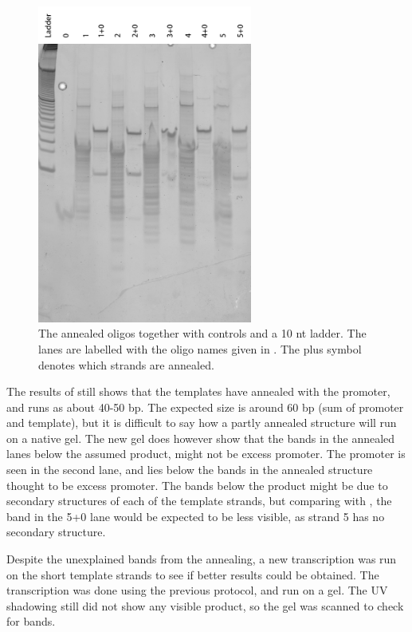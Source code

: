 \begin{figure}[H]
\centering
\includegraphics[width=200pt]{images/translator_annealing_2.png}
\caption{The annealed oligos together with controls and a 10 nt ladder. The lanes are labelled with the oligo names given in . The plus symbol denotes which strands are annealed.}
\label{translator_annealing_2}
\end{figure}

The results of  still shows that the templates have annealed with the promoter, and runs as about 40-50 bp. The expected size is around 60 bp (sum of promoter and template), but it is difficult to say how a partly annealed structure will run on a native gel. The new gel does however show that the bands in the annealed lanes below the assumed product, might not be excess promoter. The promoter is seen in the second lane, and lies below the bands in the annealed structure thought to be excess promoter. The bands below the product might be due to secondary structures of each of the template strands, but comparing with , the band in the 5+0 lane would be expected to be less visible, as strand 5 has no secondary structure.

Despite the unexplained bands from the annealing, a new transcription was run on the short template strands to see if better results could be obtained. The transcription was done using the previous protocol, and run on a gel. The UV shadowing still did not show any visible product, so the gel was scanned to check for bands.

